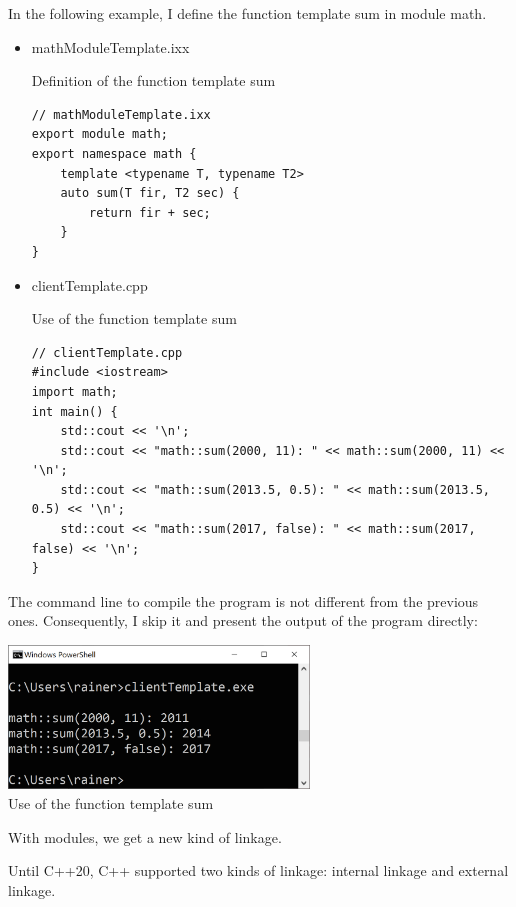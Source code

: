 In the following example, I define the function template sum in module math.

\begin{itemize}
\item 
mathModuleTemplate.ixx

\noindent
Definition of the function template sum
\begin{lstlisting}[style=styleCXX]
// mathModuleTemplate.ixx
export module math;
export namespace math {
	template <typename T, typename T2>
	auto sum(T fir, T2 sec) {
		return fir + sec;
	}
}
\end{lstlisting}

\item 
clientTemplate.cpp

\noindent
Use of the function template sum
\begin{lstlisting}[style=styleCXX]
// clientTemplate.cpp
#include <iostream>
import math;
int main() {
	std::cout << '\n';
	std::cout << "math::sum(2000, 11): " << math::sum(2000, 11) << '\n';
	std::cout << "math::sum(2013.5, 0.5): " << math::sum(2013.5, 0.5) << '\n';
	std::cout << "math::sum(2017, false): " << math::sum(2017, false) << '\n';
}
\end{lstlisting}
\end{itemize}

The command line to compile the program is not different from the previous ones. Consequently, I skip it and present the output of the program directly:

\begin{center}
\includegraphics[width=0.6\textwidth]{content/3/chapter4/images/24.png}\\
Use of the function template sum
\end{center}

With modules, we get a new kind of linkage.


Until C++20, C++ supported two kinds of linkage: internal linkage and external linkage.

